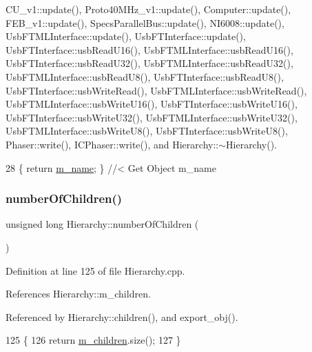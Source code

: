 C\+U\+\_\+v1\+::update(), Proto40\+M\+Hz\+\_\+v1\+::update(), Computer\+::update(), F\+E\+B\+\_\+v1\+::update(), Specs\+Parallel\+Bus\+::update(), N\+I6008\+::update(), Usb\+F\+T\+M\+L\+Interface\+::update(), Usb\+F\+T\+Interface\+::update(), Usb\+F\+T\+Interface\+::usb\+Read\+U16(), Usb\+F\+T\+M\+L\+Interface\+::usb\+Read\+U16(), Usb\+F\+T\+Interface\+::usb\+Read\+U32(), Usb\+F\+T\+M\+L\+Interface\+::usb\+Read\+U32(), Usb\+F\+T\+M\+L\+Interface\+::usb\+Read\+U8(), Usb\+F\+T\+Interface\+::usb\+Read\+U8(), Usb\+F\+T\+Interface\+::usb\+Write\+Read(), Usb\+F\+T\+M\+L\+Interface\+::usb\+Write\+Read(), Usb\+F\+T\+M\+L\+Interface\+::usb\+Write\+U16(), Usb\+F\+T\+Interface\+::usb\+Write\+U16(), Usb\+F\+T\+Interface\+::usb\+Write\+U32(), Usb\+F\+T\+M\+L\+Interface\+::usb\+Write\+U32(), Usb\+F\+T\+M\+L\+Interface\+::usb\+Write\+U8(), Usb\+F\+T\+Interface\+::usb\+Write\+U8(), Phaser\+::write(), I\+C\+Phaser\+::write(), and Hierarchy\+::$\sim$\+Hierarchy().


\begin{DoxyCode}
28 \{ \textcolor{keywordflow}{return} \hyperlink{classObject_a8b83c95c705d2c3ba0d081fe1710f48d}{m\_name}; \} \textcolor{comment}{//< Get Object m\_name}
\end{DoxyCode}
\mbox{\label{classHierarchy_ab16e84de65fd84e14001a6cf941c8be4}} 
\subsubsection{\texorpdfstring{number\+Of\+Children()}{numberOfChildren()}}
{\footnotesize\ttfamily unsigned long Hierarchy\+::number\+Of\+Children (\begin{DoxyParamCaption}{ }\end{DoxyParamCaption})\hspace{0.3cm}{\ttfamily [inherited]}}



Definition at line 125 of file Hierarchy.\+cpp.



References Hierarchy\+::m\+\_\+children.



Referenced by Hierarchy\+::children(), and export\+\_\+obj().


\begin{DoxyCode}
125                                            \{
126   \textcolor{keywordflow}{return} \hyperlink{classHierarchy_a038816763941fd4a930504917f60483b}{m\_children}.size();
127 \}
\end{DoxyCode}
\mbox{\label{classHierarchy_aee461dc930ce3871636ff87f075b1b83}} 
